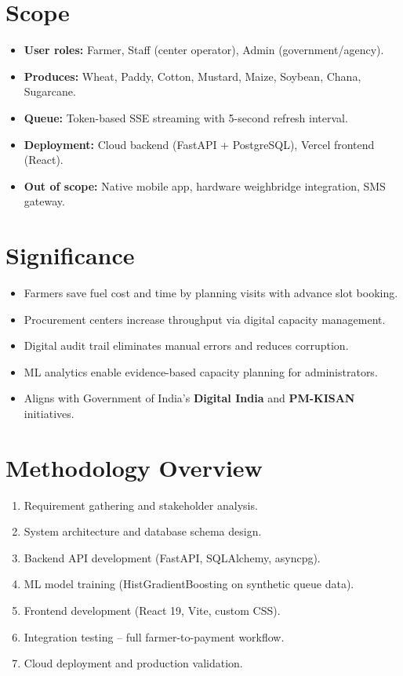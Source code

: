 \section{Scope}
\begin{itemize}
  \item \textbf{User roles:} Farmer, Staff (center operator), Admin (government/agency).
  \item \textbf{Produces:} Wheat, Paddy, Cotton, Mustard, Maize, Soybean, Chana, Sugarcane.
  \item \textbf{Queue:} Token-based SSE streaming with 5-second refresh interval.
  \item \textbf{Deployment:} Cloud backend (FastAPI + PostgreSQL), Vercel frontend (React).
  \item \textbf{Out of scope:} Native mobile app, hardware weighbridge integration, SMS gateway.
\end{itemize}

\section{Significance}
\begin{itemize}
  \item Farmers save fuel cost and time by planning visits with advance slot booking.
  \item Procurement centers increase throughput via digital capacity management.
  \item Digital audit trail eliminates manual errors and reduces corruption.
  \item ML analytics enable evidence-based capacity planning for administrators.
  \item Aligns with Government of India's \textbf{Digital India} and \textbf{PM-KISAN} initiatives.
\end{itemize}

\section{Methodology Overview}
\begin{enumerate}
  \item Requirement gathering and stakeholder analysis.
  \item System architecture and database schema design.
  \item Backend API development (FastAPI, SQLAlchemy, asyncpg).
  \item ML model training (HistGradientBoosting on synthetic queue data).
  \item Frontend development (React 19, Vite, custom CSS).
  \item Integration testing -- full farmer-to-payment workflow.
  \item Cloud deployment and production validation.
\end{enumerate}
